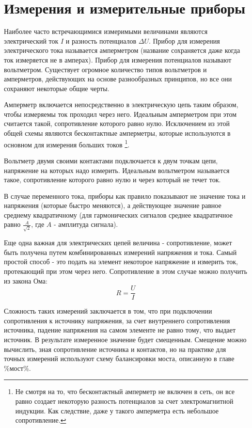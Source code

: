 \section{Измерения и измерительные приборы}

Наиболее часто встречающимися измеримыми величинами являются электрический ток $I$ и разность потенциалов $\Delta U$. Прибор для измерения электрического тока называется амперметром (название сохраняется даже когда ток измеряется не в амперах). Прибор для измерения потенциалов называют вольтметром. Существует огромное количество типов вольтметров и амперметров, действующих на основе разнообразных принципов, но все они сохраняют некоторые общие черты.

Амперметр включается непосредственно в электрическую цепь таким образом, чтобы измеряемы ток проходил через него. Идеальным амперметром при этом считается такой, сопротивление которого равно нулю. Исключением из этой общей схемы являются бесконтактные амперметры, которые используются в основном для измерения больших токов \footnote{Не смотря на то, что бесконтактный амперметр не включен в сеть, он все равно создает некоторую разность потенциалов за счет электромагнитной индукции. Как следствие, даже у такого амперметра есть небольшое сопротивление.}. 

Вольтметр двумя своими контактами подключается к двум точкам цепи, напряжение на которых надо измерить. Идеальным вольтметром называется такое, сопротивление которого равно нулю и через который не течет ток.

В случае переменного тока, приборы как правило показывают не значение тока и напряжения (которые быстро меняются), а действующее значение равное среднему квадратичному (для гармонических сигналов среднее квадратичное равно $\frac{A}{\sqrt{2}}$, где $A$ - амплитуда сигнала).

Еще одна важная для электрических цепей величина - сопротивление, может быть получена путем комбинированных измерений напряжения и тока. Самый простой способ - это подать на элемент некоторое напряжение и измерить ток, протекающий при этом через него. Сопротивление в этом случае можно получить из закона Ома:
\begin{equation}
	R = \frac{U}{I}
\end{equation}

Сложность таких измерений заключается в том, что при подключении сопротивления к источнику напряжения, за счет внутреннего сопротивления источника, падение напряжения на самом элементе не равно тому, что выдает источник. В результате измеренное значение будет смещенным. Смещение можно вычислить, зная сопротивление источника и контактов, но на практике для точных измерений используют схему балансировки моста, описанную в главе \%мост\%.


